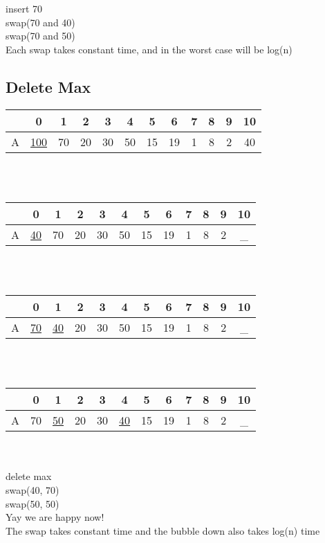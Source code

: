 \documentclass[12pt]{article}
\begin{document}
	insert 70\\
	swap(70 and 40)\\
	swap(70 and 50)\\
	
	Each swap takes constant time, and in the worst case will be log(n)\\
	
	\subsection*{Delete Max}
	\begin{tabular}{c | c | c | c | c | c | c | c | c | c | c | c}
		& 0 & 1 & 2 & 3 & 4 & 5 & 6 & 7 & 8 & 9 & 10 \\ \hline
		A & \underline{100} & 70 & 20 & 30 & 50 & 15 & 19 & 1 & 8 & 2 & 40 \\
	\end{tabular}\\\\
	\begin{tabular}{c | c | c | c | c | c | c | c | c | c | c | c}
		& 0 & 1 & 2 & 3 & 4 & 5 & 6 & 7 & 8 & 9 & 10 \\ \hline
		A & \underline{40} & 70 & 20 & 30 & 50 & 15 & 19 & 1 & 8 & 2 & \_ \\
	\end{tabular}\\\\
	\begin{tabular}{c | c | c | c | c | c | c | c | c | c | c | c}
		& 0 & 1 & 2 & 3 & 4 & 5 & 6 & 7 & 8 & 9 & 10 \\ \hline
		A & \underline{70} & \underline{40} & 20 & 30 & 50 & 15 & 19 & 1 & 8 & 2 & \_ \\
	\end{tabular}\\\\
	\begin{tabular}{c | c | c | c | c | c | c | c | c | c | c | c}
		& 0 & 1 & 2 & 3 & 4 & 5 & 6 & 7 & 8 & 9 & 10 \\ \hline
		A & 70 & \underline{50} & 20 & 30 & \underline{40} & 15 & 19 & 1 & 8 & 2 & \_ \\
	\end{tabular}\\\\
	
	delete max\\
	swap(40, 70)\\
	swap(50, 50)\\
	Yay we are happy now!\\
	The swap takes constant time and the bubble down also takes log(n) time\\
	
\end{document}
